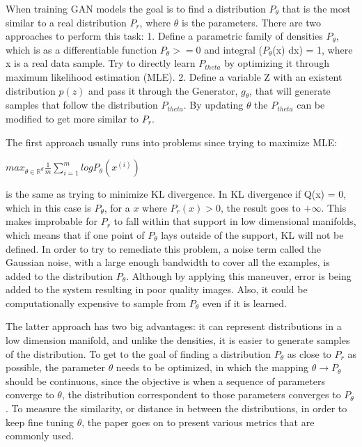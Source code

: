 
When training GAN models the goal is to find a distribution $P_{\theta}$ that is the most similar to a real distribution $P_{r}$, where $\theta$ is the parameters. There are two approaches to perform this task:
1. Define a parametric family of densities $P_{\theta}$, which is as a differentiable function $P_{\theta} >= 0$ and integral ($P_{\theta}$(x) dx) = 1, where x is a real data sample. Try to directly learn $P_{theta}$ by optimizing it through maximum likelihood estimation (MLE).
2. Define a variable Z with an existent distribution $p(z)$ and pass it through the Generator, $g_{\theta}$, that will generate samples that follow the distribution $P_{theta}$. By updating $\theta$ the $P_{theta}$ can be modified to get more similar to $P_{r}$.

The first approach usually runs into problems since trying to maximize MLE:
\begin{center}
	$max_{\theta\in \mathbb{R}^{d}} \frac{1}{m} \sum_{i=1}^{m} log P_{\theta}(x^{(i)})$
\end{center}
is the same as trying to minimize KL divergence.
In KL divergence if Q(x) = 0, which in this case is $P_{\theta}$, for a $x$ where $P_{r}(x) > 0$, the result goes to $+\infty$. This makes improbable for $P_{r}$ to fall within that support in low dimensional manifolds, which means that if one point of $P_{\theta}$ lays outside of the support, KL will not be defined. In order to try to remediate this problem, a noise term called the Gaussian noise, with a large enough bandwidth to cover all the examples, is added to the distribution $P_{\theta}$. Although by applying this maneuver, error is being added to the system resulting in poor quality images. Also, it could be computationally expensive to sample from $P_{\theta}$ even if it is learned.

The latter approach has two big advantages: it can represent distributions in a low dimension manifold, and unlike the densities, it is easier to generate samples of the distribution. To get to the goal of finding a distribution  $P_{\theta}$ as close to $P_{r}$ as possible, the parameter $\theta$ needs to be optimized, in which the mapping $\theta \rightarrow P_{\theta}$ should be continuous, since the objective is when a sequence of parameters converge to $\theta$, the distribution correspondent to those parameters converges to $P_{\theta}$. To measure the similarity, or distance in between the distributions, in order to keep fine tuning $\theta$, the paper goes on to present various metrics that are commonly used. 

